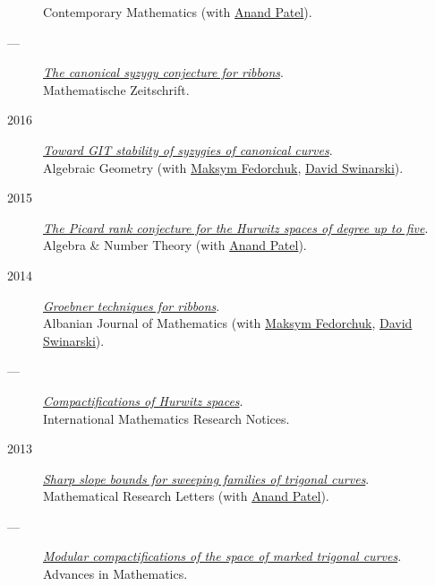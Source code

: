 \documentclass[11pt]{article}
\begin{document}
\begin{description}
Contemporary Mathematics (with \href{https://sites.google.com/view/anand-patel}{Anand Patel}).
\item[{---}] \emph{\href{papers/RibbonGreen.pdf}{The canonical syzygy conjecture for ribbons}}.\\
Mathematische Zeitschrift.
\item[{2016}] \emph{\href{papers/gitsyzygy.pdf}{Toward GIT stability of syzygies of canonical curves}}.\\
Algebraic Geometry (with \href{https://www2.bc.edu/maksym-fedorchuk/}{Maksym Fedorchuk}, \href{http://faculty.fordham.edu/dswinarski/}{David Swinarski}).
\item[{2015}] \emph{\href{papers/PicH345.pdf}{The Picard rank conjecture for the Hurwitz spaces of degree up to five}}.\\
Algebra \& Number Theory (with \href{https://www2.bc.edu/anand-p-patel/}{Anand Patel}).
\item[{2014}] \emph{\href{papers/groebner.pdf}{Groebner techniques for ribbons}}.\\
Albanian Journal of Mathematics (with \href{https://www2.bc.edu/maksym-fedorchuk/}{Maksym Fedorchuk}, \href{http://faculty.fordham.edu/dswinarski/}{David Swinarski}).
\item[{---}] \emph{\href{papers/CompHurwitz.pdf}{Compactifications of Hurwitz spaces}}.\\
International Mathematics Research Notices.
\item[{2013}] \emph{\href{papers/TrigonalSlopes.pdf}{Sharp slope bounds for sweeping families of trigonal curves}}.\\
Mathematical Research Letters (with \href{https://sites.google.com/view/anand-patel}{Anand Patel}).
\item[{---}] \emph{\href{papers/MarkedTrigonal.pdf}{Modular compactifications of the space of marked trigonal curves}}.\\
Advances in Mathematics.
\end{description}
\end{document}
